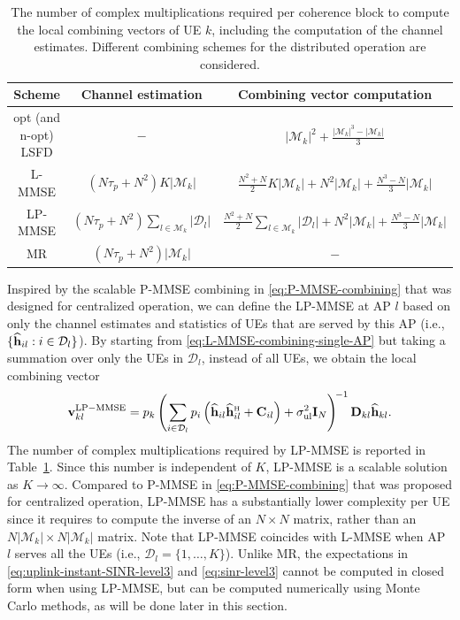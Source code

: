 \begin{table} 
\centering
    \begin{tabular}{|c|c|c|} \hline
    Scheme & {Channel estimation} & Combining vector computation \\ \hline \hline
        opt (and n-opt) LSFD & $-$ & $|\mathcal{M}_k|^2+\frac{|\mathcal{M}_k|^3-|\mathcal{M}_k|}{3}$ \\ \hline
        L-MMSE  &  $(N\tau_p + N^2)K |\mathcal{M}_k|$ &$\frac{N^2 + N}{2} K |\mathcal{M}_k| + N^2 |\mathcal{M}_k| +\frac{N^3-N}{3} |\mathcal{M}_k| $\\   \hline
            LP-MMSE & $(N\tau_p + N^2)\sum\limits_{l \in \mathcal{M}_k}|\mathcal{D}_l|$ & $\frac{N^2 + N}{2} \!\!\!\!\sum\limits_{l \in \mathcal{M}_k}\!\!|\mathcal{D}_l| + N^2 |\mathcal{M}_k| +\frac{N^3-N}{3} |\mathcal{M}_k| $  \\ \hline
                MR & $(N\tau_p + N^2)|\mathcal{M}_k|$ & $-$ \\ \hline
    \end{tabular}
    \caption{The number of complex multiplications required per coherence block to compute the local combining vectors of UE $k$, including the computation of the channel estimates. Different combining schemes for the distributed operation are considered.} 
     \label{table:complexity-with-level3}
\end{table}


Inspired by the scalable P-MMSE combining in \eqref{eq:P-MMSE-combining} that was designed for centralized operation, we can define the \gls{LP-MMSE} at AP $l$ based on only the channel estimates and statistics of UEs that are served by this AP (i.e., $\{\widehat{\mathbf{h}}_{il} : i \in \mathcal{D}_l\}$). By starting from \eqref{eq:L-MMSE-combining-single-AP} but taking a summation over only the UEs in $\mathcal{D}_l$, instead of all UEs, we obtain the local combining vector
\begin{equation} \label{eq:LP-MMSE-combining-single-AP-1}
\vect{v}_{kl}^{{\rm LP-MMSE}} =  p_{k}  \left( \sum\limits_{i \in \mathcal{D}_l} p_{i} \left( \widehat{\vect{h}}_{il} \widehat{\vect{h}}_{il}^{\Htran} + \vect{C}_{il} \right) + \sigmaUL  \vect{I}_{N} \right)^{\!-1}   \vect{D}_{kl} \widehat{\vect{h}}_{kl}.
\end{equation}
The number of complex multiplications required by LP-MMSE is reported in Table~\ref{table:complexity-with-level3}. Since this number is independent of $K$, LP-MMSE is a scalable solution as $K\to \infty$.
Compared to P-MMSE in \eqref{eq:P-MMSE-combining} that was proposed for centralized operation, LP-MMSE has a substantially lower complexity per UE since it requires to compute the inverse of an $N\times N$ matrix, rather than an $N|\mathcal{M}_k|\times N|\mathcal{M}_k|$ matrix. Note that LP-MMSE coincides with L-MMSE when AP $l$ serves all the UEs (i.e., $\mathcal{D}_l=\{1,\ldots,K\}$).
Unlike MR, the expectations in \eqref{eq:uplink-instant-SINR-level3} and \eqref{eq:sinr-level3} cannot be computed in closed form when using LP-MMSE, but can be computed numerically using Monte Carlo methods, as will be done later in this section.
	
